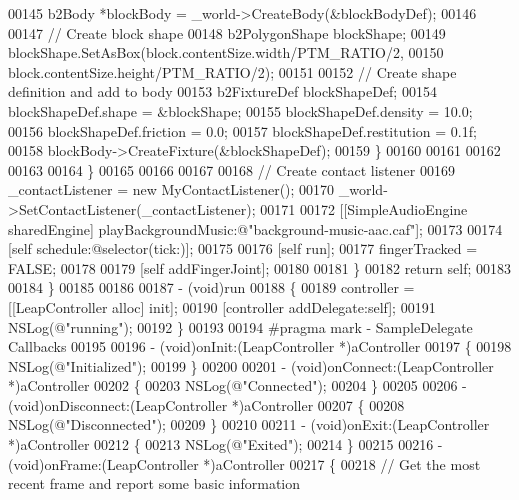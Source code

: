 \begin{DoxyCode}
00145                 b2Body *blockBody = \_world->CreateBody(&blockBodyDef);
00146                 
00147                 \textcolor{comment}{// Create block shape}
00148                 b2PolygonShape blockShape;
00149                 blockShape.SetAsBox(block.contentSize.width/PTM\_RATIO/2,
00150                                     block.contentSize.height/PTM\_RATIO/2);
00151                 
00152                 \textcolor{comment}{// Create shape definition and add to body}
00153                 b2FixtureDef blockShapeDef;
00154                 blockShapeDef.shape = &blockShape;
00155                 blockShapeDef.density = 10.0;
00156                 blockShapeDef.friction = 0.0;
00157                 blockShapeDef.restitution = 0.1f;
00158                 blockBody->CreateFixture(&blockShapeDef);
00159             \}
00160             
00161             
00162 
00163             
00164         \}
00165         
00166         
00167         
00168         \textcolor{comment}{// Create contact listener}
00169         \_contactListener = \textcolor{keyword}{new} MyContactListener();
00170         \_world->SetContactListener(\_contactListener);
00171         
00172         [[SimpleAudioEngine sharedEngine] playBackgroundMusic:@"background-music-aac.caf"];
00173         
00174         [\textcolor{keyword}{self} schedule:@selector(tick:)];
00175         
00176         [\textcolor{keyword}{self} run];
00177         fingerTracked = FALSE;
00178         
00179         [\textcolor{keyword}{self} addFingerJoint];
00180         
00181     \}
00182     \textcolor{keywordflow}{return} \textcolor{keyword}{self};
00183     
00184 \}
00185 
00186 
00187 - (void)run
00188 \{
00189     controller = [[LeapController alloc] init];
00190     [controller addDelegate:self];
00191     NSLog(\textcolor{stringliteral}{@"running"});
00192 \}
00193 
00194 \textcolor{preprocessor}{#pragma mark - SampleDelegate Callbacks}
00195 \textcolor{preprocessor}{}
00196 - (void)onInit:(LeapController *)aController
00197 \{
00198     NSLog(\textcolor{stringliteral}{@"Initialized"});
00199 \}
00200 
00201 - (void)onConnect:(LeapController *)aController
00202 \{
00203     NSLog(\textcolor{stringliteral}{@"Connected"});
00204 \}
00205 
00206 - (void)onDisconnect:(LeapController *)aController
00207 \{
00208     NSLog(\textcolor{stringliteral}{@"Disconnected"});
00209 \}
00210 
00211 - (void)onExit:(LeapController *)aController
00212 \{
00213     NSLog(\textcolor{stringliteral}{@"Exited"});
00214 \}
00215 
00216 - (void)onFrame:(LeapController *)aController
00217 \{
00218     \textcolor{comment}{// Get the most recent frame and report some basic information}

\end{DoxyCode}
